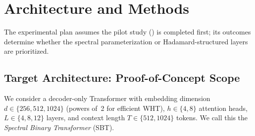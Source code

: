 \documentclass[12pt,a4paper]{article}
\theoremstyle{plain}
\theoremstyle{definition}
\theoremstyle{remark}
\begin{document}
\newpage
\section{Architecture and Methods}\label{sec:methods}

The experimental plan assumes the pilot study () is completed first; its outcomes determine whether the spectral parameterization or Hadamard-structured layers are prioritized.

\subsection{Target Architecture: Proof-of-Concept Scope}\label{sec:target}

We consider a decoder-only Transformer with embedding dimension $d \in \{256, 512, 1024\}$ (powers of~2 for efficient WHT), $h \in \{4, 8\}$ attention heads, $L \in \{4, 8, 12\}$ layers, and context length $T \in \{512, 1024\}$ tokens. We call this the \emph{Spectral Binary Transformer} (SBT).
\end{document}
